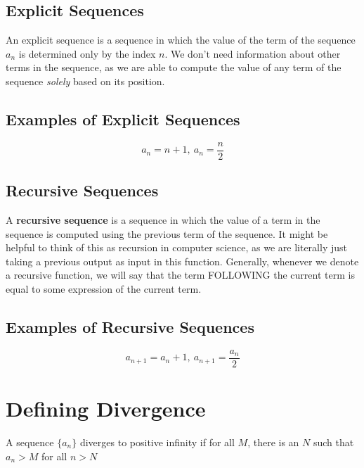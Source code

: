 \documentclass{report}
\begin{document}
\begin{sloppypar}
\subsection{Explicit Sequences}
An explicit sequence is a sequence in which the value of the term of the sequence $ a_{n}$ is determined only by the
index $ n $. We don't need information about other terms in the sequence, as we are able to compute the value of any
term of the sequence \textit{solely} based on its position.
\subsection{Examples of Explicit Sequences}
\[ a_{n} = n + 1, ~ a_{n} = \frac{n}{2} \]
\subsection{Recursive Sequences}
A \textbf{recursive sequence} is a sequence in which the value of a term in the sequence is computed using the previous
term of the sequence. It might be helpful to think of this as recursion in computer science, as we are literally just taking
a previous output as input in this function. Generally, whenever we denote a recursive function, we will say that the
term FOLLOWING the current term is equal to some expression of the current term.
\subsection{Examples of Recursive Sequences}
\[ a_{n+1} = a_{n} + 1, ~ a_{n+1} = \frac{a_{n}}{2}\]



\section{Defining Divergence}
\begin{center}
          {A sequence $ \{ a_{n} \}$ diverges to positive infinity if for all $ M $, there is an $ N $ such that $ a_{n} > M $
      for all $ n > N $
     }
\end{center}
\begin{center}
\end{center}


\end{sloppypar}
\end{document}
